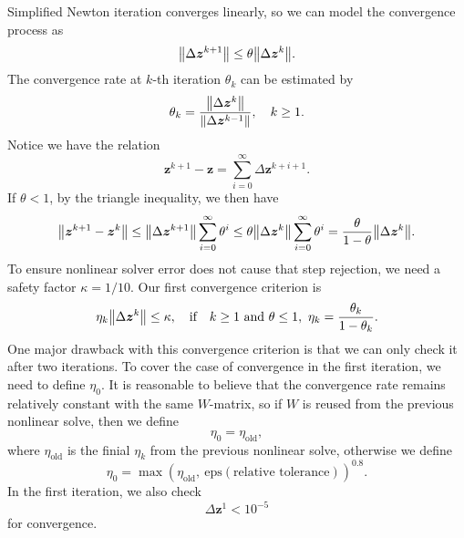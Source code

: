 \documentclass[a4paper,9pt]{article}
\theoremstyle{definition}
\theoremstyle{remark}
\begin{document}
Simplified Newton iteration converges linearly, so we can model the convergence
process as
\begin{equation}
  \norm{\Delta \bm{z}^{k+1}} \le \theta \norm{\Delta \bm{z}^{k}}.
\end{equation}
The convergence rate at $k$-th iteration $\theta_k$ can be estimated by
\begin{equation}
  \theta_k = \frac{\norm{\Delta\bm{z}^{k}}}{\norm{\Delta\bm{z}^{k-1}}},\quad k\ge 1.
\end{equation}
Notice we have the relation
\begin{equation}
  \bm{z}^{k+1} - \bm{z} = \sum_{i=0}^\infty \Delta\bm{z}^{k+i+1}.
\end{equation}
If $\theta<1$, by the triangle inequality, we then have
\begin{equation}
  \norm{\bm{z}^{k+1} - \bm{z}^{k}} \le
  \norm{\Delta\bm{z}^{k+1}}\sum_{i=0}^\infty \theta^i \le \theta
  \norm{\Delta\bm{z}^{k}}\sum_{i=0}^\infty \theta^i = \frac{\theta}{1-\theta}
  \norm{\Delta\bm{z}^{k}}.
\end{equation}
To ensure nonlinear solver error does not cause that step rejection, we need a
safety factor $\kappa = 1/10$. Our first convergence criterion is
\begin{equation}
  \eta_k \norm{\Delta\bm{z}^k} \le \kappa, \qq{if}
  k \ge 1 \text{ and } \theta \le 1, ~ \eta_k=\frac{\theta_k}{1-\theta_k}.
\end{equation}
One major drawback with this convergence criterion is that we can only check it
after two iterations. To cover the case of convergence in the first iteration,
we need to define $\eta_0$. It is reasonable to believe that the convergence
rate remains relatively constant with the same $W$-matrix, so if $W$ is reused
 from the previous nonlinear solve,
then we define
\begin{equation}
  \eta_0 = \eta_{\text{old}},
\end{equation}
where $\eta_{\text{old}}$ is the finial $\eta_k$ from the previous nonlinear
solve, otherwise we define
\begin{equation}
  \eta_0 = \max(\eta_{\text{old}}, ~\text{eps}(\text{relative
  tolerance}))^{0.8}.
\end{equation}
In the first iteration, we also check
\begin{equation}
  \Delta\bm{z}^{1} < 10^{-5}
\end{equation}
for convergence. 
\end{document}
